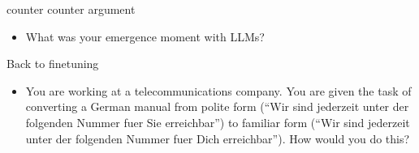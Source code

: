 

\begin{vbframe}{counter counter argument}

\vfill

%
\begin{itemize}
\item \ques What was your emergence moment with LLMs?


%
\end{itemize}


\vfill

\end{vbframe}

\begin{vbframe}{Back to finetuning}

\vfill

%
\begin{itemize}
\item \ques You are working at a telecommunications
company. You are given the task of converting a German manual from
polite form (``Wir sind jederzeit unter der folgenden
Nummer fuer Sie erreichbar'') to familiar form
(``Wir sind jederzeit unter der folgenden
Nummer fuer Dich erreichbar''). How would you do this?

\end{itemize}


\vfill

\end{vbframe}









\endlecture

